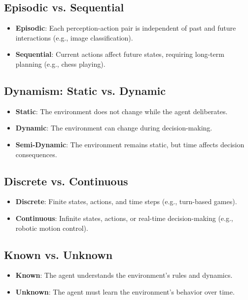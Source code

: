 \documentclass[conference]{IEEEtran}
\begin{document}
\subsection{Episodic vs. Sequential}
\begin{itemize}
    \item \textbf{Episodic}: Each perception-action pair is independent of past and future interactions (e.g., image classification).
    \item \textbf{Sequential}: Current actions affect future states, requiring long-term planning (e.g., chess playing).
\end{itemize}

\subsection{Dynamism: Static vs. Dynamic}
\begin{itemize}
    \item \textbf{Static}: The environment does not change while the agent deliberates.
    \item \textbf{Dynamic}: The environment can change during decision-making.
    \item \textbf{Semi-Dynamic}: The environment remains static, but time affects decision consequences.
\end{itemize}

\subsection{Discrete vs. Continuous}
\begin{itemize}
    \item \textbf{Discrete}: Finite states, actions, and time steps (e.g., turn-based games).
    \item \textbf{Continuous}: Infinite states, actions, or real-time decision-making (e.g., robotic motion control).
\end{itemize}

\subsection{Known vs. Unknown}
\begin{itemize}
    \item \textbf{Known}: The agent understands the environment's rules and dynamics.
    \item \textbf{Unknown}: The agent must learn the environment's behavior over time.
\end{itemize}
\end{document}
